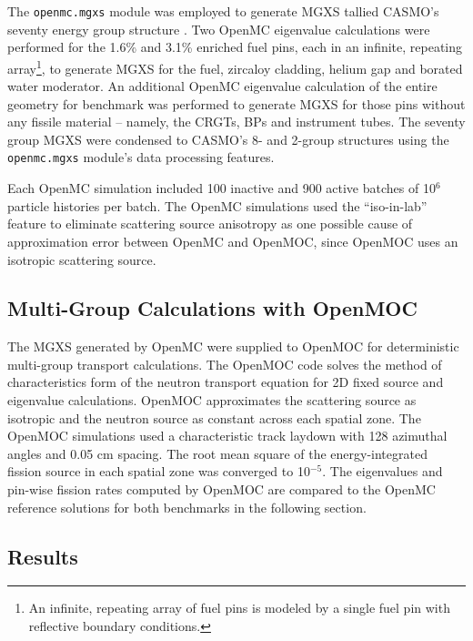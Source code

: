 The \texttt{openmc.mgxs} module was employed to generate MGXS tallied CASMO's seventy energy group structure \cite{rhodes2006casmo}. Two OpenMC eigenvalue calculations were performed for the 1.6\% and 3.1\% enriched fuel pins, each in an infinite, repeating array\footnote{An infinite, repeating array of fuel pins is modeled by a single fuel pin with reflective boundary conditions.}, to generate MGXS for the fuel, zircaloy cladding, helium gap and borated water moderator. An additional OpenMC eigenvalue calculation of the entire geometry for benchmark was performed to generate MGXS for those pins without any fissile material -- namely, the CRGTs, BPs and instrument tubes. The seventy group MGXS were condensed to CASMO's 8- and 2-group structures using the \texttt{openmc.mgxs} module's data processing features.

Each OpenMC simulation included 100 inactive and 900 active batches of 10$^{6}$ particle histories per batch. The OpenMC simulations used the ``iso-in-lab'' feature to eliminate scattering source anisotropy as one possible cause of approximation error between OpenMC and OpenMOC, since OpenMOC uses an isotropic scattering source.


\subsection{Multi-Group Calculations with OpenMOC}
\label{subsec:openmoc}

The MGXS generated by OpenMC were supplied to OpenMOC \cite{boyd2014openmoc} for deterministic multi-group transport calculations. The OpenMOC code solves the method of characteristics form of the neutron transport equation for 2D fixed source and eigenvalue calculations. OpenMOC approximates the scattering source as isotropic and the neutron source as constant across each spatial zone. The OpenMOC simulations used a characteristic track laydown with 128 azimuthal angles and 0.05 cm spacing. The root mean square of the energy-integrated fission source in each spatial zone was converged to 10$^{-5}$. The eigenvalues and pin-wise fission rates computed by OpenMOC are compared to the OpenMC reference solutions for both benchmarks in the following section.


\subsection{Results}
\label{subsec:results}

